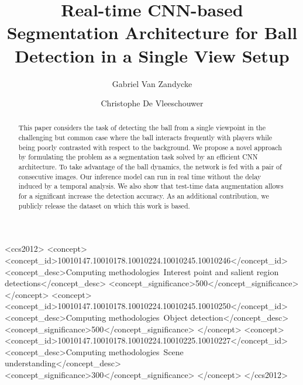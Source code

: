 \documentclass[sigconf, screen]{acmart}
\begin{document}
\fancyhead{}

\title[CNN-based Segmentation Architecture for Ball Detection]
{Real-time CNN-based Segmentation Architecture for Ball Detection in a Single View Setup}

\newcommand{\tbr}[1]{{#1}}



\author{Gabriel Van Zandycke}

\author{Christophe De Vleeschouwer}


\begin{abstract}
This paper considers the task of detecting the ball from a single viewpoint in the challenging but common case where the ball interacts frequently with players while being poorly contrasted with respect to the background.
We propose a novel approach by formulating the problem as a segmentation task solved by an efficient CNN architecture. To take advantage of the ball dynamics, the network is fed with a pair of consecutive images.
Our inference model can run in real time without the delay induced by a temporal analysis. We also show that test-time data augmentation allows for a significant increase the detection accuracy. As an additional contribution, we publicly release the dataset on which this work is based.
\end{abstract}

\begin{CCSXML}
    <ccs2012>
    <concept>
    <concept_id>10010147.10010178.10010224.10010245.10010246</concept_id>
    <concept_desc>Computing methodologies~Interest point and salient region detections</concept_desc>
    <concept_significance>500</concept_significance>
    </concept>
    <concept>
    <concept_id>10010147.10010178.10010224.10010245.10010250</concept_id>
    <concept_desc>Computing methodologies~Object detection</concept_desc>
    <concept_significance>500</concept_significance>
    </concept>
    <concept>
    <concept_id>10010147.10010178.10010224.10010225.10010227</concept_id>
    <concept_desc>Computing methodologies~Scene understanding</concept_desc>
    <concept_significance>300</concept_significance>
    </concept>
    </ccs2012>
\end{CCSXML}
\end{document}
